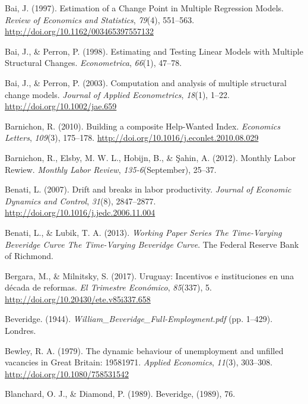 \documentclass[12pt,oneside]{reedthesis}
\begin{document}
\leavevmode\hypertarget{ref-Bai1997}{}%
Bai, J. (1997). Estimation of a Change Point in Multiple Regression Models. \emph{Review of Economics and Statistics}, \emph{79}(4), 551--563. \url{http://doi.org/10.1162/003465397557132}

\leavevmode\hypertarget{ref-BaiPerron1998}{}%
Bai, J., \& Perron, P. (1998). Estimating and Testing Linear Models with Multiple Structural Changes. \emph{Econometrica}, \emph{66}(1), 47--78.

\leavevmode\hypertarget{ref-BaiPerron2003}{}%
Bai, J., \& Perron, P. (2003). Computation and analysis of multiple structural change models. \emph{Journal of Applied Econometrics}, \emph{18}(1), 1--22. \url{http://doi.org/10.1002/jae.659}

\leavevmode\hypertarget{ref-Barnichon2010}{}%
Barnichon, R. (2010). Building a composite Help-Wanted Index. \emph{Economics Letters}, \emph{109}(3), 175--178. \url{http://doi.org/10.1016/j.econlet.2010.08.029}

\leavevmode\hypertarget{ref-Barnichon2012}{}%
Barnichon, R., Elsby, M. W. L., Hobijn, B., \& Şahin, A. (2012). Monthly Labor Rewiew. \emph{Monthly Labor Review}, \emph{135-6}(September), 25--37.

\leavevmode\hypertarget{ref-Benati2007}{}%
Benati, L. (2007). Drift and breaks in labor productivity. \emph{Journal of Economic Dynamics and Control}, \emph{31}(8), 2847--2877. \url{http://doi.org/10.1016/j.jedc.2006.11.004}

\leavevmode\hypertarget{ref-Benati2013}{}%
Benati, L., \& Lubik, T. A. (2013). \emph{Working Paper Series The Time-Varying Beveridge Curve The Time-Varying Beveridge Curve}. The Federal Reserve Bank of Richmond.

\leavevmode\hypertarget{ref-Bergara2017}{}%
Bergara, M., \& Milnitsky, S. (2017). Uruguay: Incentivos e instituciones en una década de reformas. \emph{El Trimestre Económico}, \emph{85}(337), 5. \url{http://doi.org/10.20430/ete.v85i337.658}

\leavevmode\hypertarget{ref-Beveridge}{}%
Beveridge. (1944). \emph{William\_Beveridge\_Full-Employment.pdf} (pp. 1--429). Londres.

\leavevmode\hypertarget{ref-Bewley1979}{}%
Bewley, R. A. (1979). The dynamic behaviour of unemployment and unfilled vacancies in Great Britain: 19581971. \emph{Applied Economics}, \emph{11}(3), 303--308. \url{http://doi.org/10.1080/758531542}

\leavevmode\hypertarget{ref-Blanchard1989}{}%
Blanchard, O. J., \& Diamond, P. (1989). Beveridge, (1989), 76.
\end{document}
